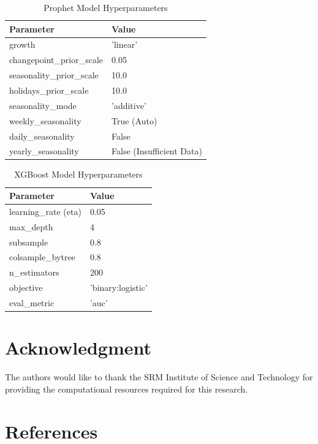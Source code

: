 \documentclass[conference]{IEEEtran}
\begin{document}
\begin{table}[h]
\centering
\caption{Prophet Model Hyperparameters}
\begin{tabular}{ll}
\toprule
\textbf{Parameter} & \textbf{Value} \\
\midrule
growth & 'linear' \\
changepoint\_prior\_scale & 0.05 \\
seasonality\_prior\_scale & 10.0 \\
holidays\_prior\_scale & 10.0 \\
seasonality\_mode & 'additive' \\
weekly\_seasonality & True (Auto) \\
daily\_seasonality & False \\
yearly\_seasonality & False (Insufficient Data) \\
\bottomrule
\end{tabular}
\label{tab:prophet_params}
\end{table}

\begin{table}[h]
\centering
\caption{XGBoost Model Hyperparameters}
\begin{tabular}{ll}
\toprule
\textbf{Parameter} & \textbf{Value} \\
\midrule
learning\_rate (eta) & 0.05 \\
max\_depth & 4 \\
subsample & 0.8 \\
colsample\_bytree & 0.8 \\
n\_estimators & 200 \\
objective & 'binary:logistic' \\
eval\_metric & 'auc' \\
\bottomrule
\end{tabular}
\label{tab:xgboost_params}
\end{table}

\section*{Acknowledgment}
The authors would like to thank the SRM Institute of Science and Technology for providing the computational resources required for this research.

\section*{References}
\end{document}
